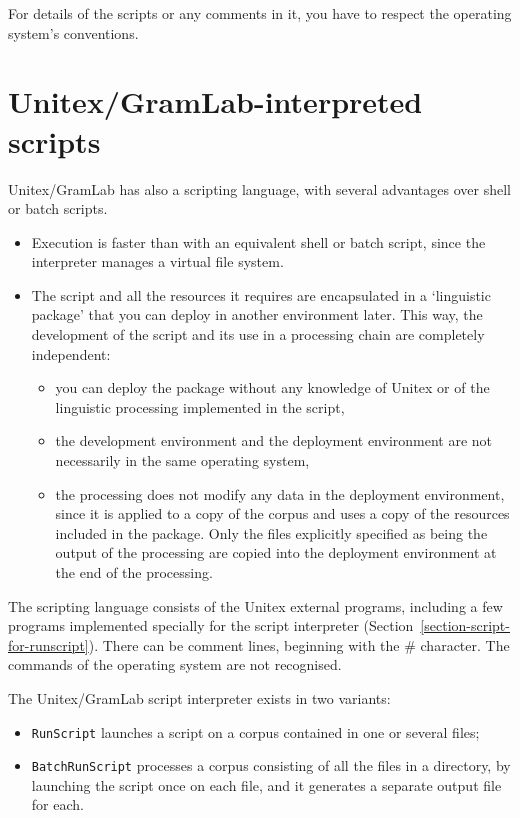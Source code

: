 \noindent For details of the scripts or any comments in it, you have to respect the operating system's
 conventions.



\section{Unitex/GramLab-interpreted scripts}
\label{section-unitex-scripts}

Unitex/GramLab has also a scripting language, with several advantages over shell or batch
scripts.
\begin{itemize}
    \item Execution is faster than with an equivalent shell or batch script, since the interpreter manages a
virtual file system.
    \item The script and all the resources it requires are encapsulated in a `linguistic package'
    that you can deploy in another environment later. This way, the development of the script and its
    use in a processing chain are completely independent:
\begin{itemize}
    \item you can deploy the package without any knowledge of Unitex or of the linguistic processing
    implemented in the script,
    \item the development environment and the deployment environment are not necessarily
    in the same operating system,
    \item the processing does not modify any data in the deployment environment, since it is applied
    to a copy of the corpus and uses a copy of the resources included in the package. Only the files
explicitly specified as being the output of the processing are copied into the deployment environment at the end 
of the processing.
\end{itemize}
\end{itemize}

\noindent The scripting language consists of the Unitex external programs, including
a few programs implemented specially for the script interpreter 
(Section~\ref{section-script-for-runscript}). There can be comment lines, beginning with 
the  \# character. The commands of the operating system are not recognised.

\bigskip{}
\noindent The Unitex/GramLab script interpreter exists in two variants:
\begin{itemize}
  \item \verb$RunScript$ launches a script on a corpus contained in one or several files;
  \item \verb$BatchRunScript$ processes a corpus consisting of all the files in a directory,
by launching the script once on each file, and it generates a separate output file for each.
\end{itemize}



